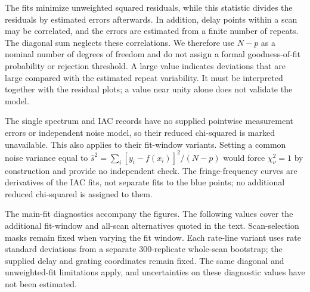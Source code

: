 The fits minimize unweighted squared residuals, while this statistic divides the residuals by estimated errors afterwards. In addition, delay points within a scan may be correlated, and the errors are estimated from a finite number of repeats. The diagonal sum neglects these correlations. We therefore use $N-p$ as a nominal number of degrees of freedom and do not assign a formal goodness-of-fit probability or rejection threshold. A large value indicates deviations that are large compared with the estimated repeat variability. It must be interpreted together with the residual plots; a value near unity alone does not validate the model.

The single spectrum and IAC records have no supplied pointwise measurement errors or independent noise model, so their reduced chi-squared is marked unavailable. This also applies to their fit-window variants. Setting a common noise variance equal to $\widehat s^2=\sum_i[y_i-f(x_i)]^2/(N-p)$ would force $\chi^2_\nu=1$ by construction and provide no independent check. The fringe-frequency curves are derivatives of the IAC fits, not separate fits to the blue points; no additional reduced chi-squared is assigned to them.

The main-fit diagnostics accompany the figures. The following values cover the additional fit-window and all-scan alternatives quoted in the text. Scan-selection masks remain fixed when varying the fit window. Each rate-line variant uses rate standard deviations from a separate 300-replicate whole-scan bootstrap; the supplied delay and grating coordinates remain fixed. The same diagonal and unweighted-fit limitations apply, and uncertainties on these diagnostic values have not been estimated.

